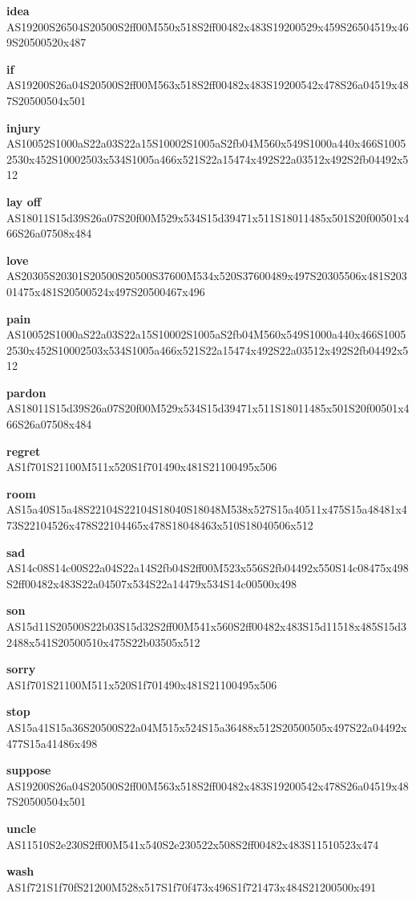 \documentclass{article}
\begin{document}
\begin{glossary}
\textbf{idea}\\
AS19200S26504S20500S2ff00M550x518S2ff00482x483S19200529x459S26504519x469S20500520x487

\textbf{if}\\
AS19200S26a04S20500S2ff00M563x518S2ff00482x483S19200542x478S26a04519x487S20500504x501

\textbf{injury}\\
AS10052S1000aS22a03S22a15S10002S1005aS2fb04M560x549S1000a440x466S10052530x452S10002503x534S1005a466x521S22a15474x492S22a03512x492S2fb04492x512

\textbf{lay off}\\
AS18011S15d39S26a07S20f00M529x534S15d39471x511S18011485x501S20f00501x466S26a07508x484

\textbf{love}\\
AS20305S20301S20500S20500S37600M534x520S37600489x497S20305506x481S20301475x481S20500524x497S20500467x496

\textbf{pain}\\
AS10052S1000aS22a03S22a15S10002S1005aS2fb04M560x549S1000a440x466S10052530x452S10002503x534S1005a466x521S22a15474x492S22a03512x492S2fb04492x512

\textbf{pardon}\\
AS18011S15d39S26a07S20f00M529x534S15d39471x511S18011485x501S20f00501x466S26a07508x484

\textbf{regret}\\
AS1f701S21100M511x520S1f701490x481S21100495x506

\textbf{room}\\
AS15a40S15a48S22104S22104S18040S18048M538x527S15a40511x475S15a48481x473S22104526x478S22104465x478S18048463x510S18040506x512

\textbf{sad}\\
AS14c08S14c00S22a04S22a14S2fb04S2ff00M523x556S2fb04492x550S14c08475x498S2ff00482x483S22a04507x534S22a14479x534S14c00500x498

\textbf{son}\\
AS15d11S20500S22b03S15d32S2ff00M541x560S2ff00482x483S15d11518x485S15d32488x541S20500510x475S22b03505x512

\textbf{sorry}\\
AS1f701S21100M511x520S1f701490x481S21100495x506

\textbf{stop}\\
AS15a41S15a36S20500S22a04M515x524S15a36488x512S20500505x497S22a04492x477S15a41486x498

\textbf{suppose}\\
AS19200S26a04S20500S2ff00M563x518S2ff00482x483S19200542x478S26a04519x487S20500504x501

\textbf{uncle}\\
AS11510S2e230S2ff00M541x540S2e230522x508S2ff00482x483S11510523x474

\textbf{wash}\\
AS1f721S1f70fS21200M528x517S1f70f473x496S1f721473x484S21200500x491

\end{glossary}
\end{document}
